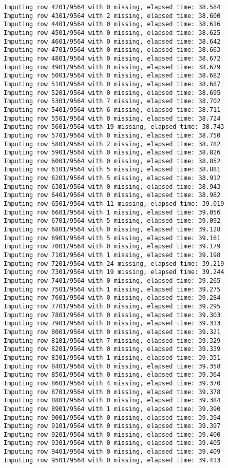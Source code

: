 \documentclass[11pt]{article}
\begin{document}
\begin{Verbatim}[commandchars=\\\{\}]
Imputing row 4201/9564 with 0 missing, elapsed time: 38.584
Imputing row 4301/9564 with 2 missing, elapsed time: 38.600
Imputing row 4401/9564 with 0 missing, elapsed time: 38.616
Imputing row 4501/9564 with 0 missing, elapsed time: 38.625
Imputing row 4601/9564 with 0 missing, elapsed time: 38.642
Imputing row 4701/9564 with 0 missing, elapsed time: 38.663
Imputing row 4801/9564 with 0 missing, elapsed time: 38.672
Imputing row 4901/9564 with 0 missing, elapsed time: 38.679
Imputing row 5001/9564 with 0 missing, elapsed time: 38.682
Imputing row 5101/9564 with 0 missing, elapsed time: 38.687
Imputing row 5201/9564 with 0 missing, elapsed time: 38.695
Imputing row 5301/9564 with 7 missing, elapsed time: 38.702
Imputing row 5401/9564 with 6 missing, elapsed time: 38.711
Imputing row 5501/9564 with 0 missing, elapsed time: 38.724
Imputing row 5601/9564 with 19 missing, elapsed time: 38.743
Imputing row 5701/9564 with 0 missing, elapsed time: 38.750
Imputing row 5801/9564 with 2 missing, elapsed time: 38.782
Imputing row 5901/9564 with 0 missing, elapsed time: 38.826
Imputing row 6001/9564 with 0 missing, elapsed time: 38.852
Imputing row 6101/9564 with 5 missing, elapsed time: 38.881
Imputing row 6201/9564 with 5 missing, elapsed time: 38.912
Imputing row 6301/9564 with 0 missing, elapsed time: 38.943
Imputing row 6401/9564 with 0 missing, elapsed time: 38.982
Imputing row 6501/9564 with 11 missing, elapsed time: 39.019
Imputing row 6601/9564 with 1 missing, elapsed time: 39.056
Imputing row 6701/9564 with 5 missing, elapsed time: 39.092
Imputing row 6801/9564 with 0 missing, elapsed time: 39.128
Imputing row 6901/9564 with 5 missing, elapsed time: 39.161
Imputing row 7001/9564 with 0 missing, elapsed time: 39.179
Imputing row 7101/9564 with 1 missing, elapsed time: 39.198
Imputing row 7201/9564 with 24 missing, elapsed time: 39.219
Imputing row 7301/9564 with 19 missing, elapsed time: 39.244
Imputing row 7401/9564 with 0 missing, elapsed time: 39.265
Imputing row 7501/9564 with 1 missing, elapsed time: 39.275
Imputing row 7601/9564 with 0 missing, elapsed time: 39.284
Imputing row 7701/9564 with 0 missing, elapsed time: 39.295
Imputing row 7801/9564 with 0 missing, elapsed time: 39.303
Imputing row 7901/9564 with 0 missing, elapsed time: 39.313
Imputing row 8001/9564 with 0 missing, elapsed time: 39.321
Imputing row 8101/9564 with 7 missing, elapsed time: 39.329
Imputing row 8201/9564 with 0 missing, elapsed time: 39.339
Imputing row 8301/9564 with 1 missing, elapsed time: 39.351
Imputing row 8401/9564 with 0 missing, elapsed time: 39.358
Imputing row 8501/9564 with 0 missing, elapsed time: 39.364
Imputing row 8601/9564 with 4 missing, elapsed time: 39.370
Imputing row 8701/9564 with 0 missing, elapsed time: 39.378
Imputing row 8801/9564 with 0 missing, elapsed time: 39.384
Imputing row 8901/9564 with 1 missing, elapsed time: 39.390
Imputing row 9001/9564 with 0 missing, elapsed time: 39.394
Imputing row 9101/9564 with 0 missing, elapsed time: 39.397
Imputing row 9201/9564 with 0 missing, elapsed time: 39.400
Imputing row 9301/9564 with 0 missing, elapsed time: 39.405
Imputing row 9401/9564 with 0 missing, elapsed time: 39.409
Imputing row 9501/9564 with 0 missing, elapsed time: 39.413


\end{Verbatim}
\end{document}
